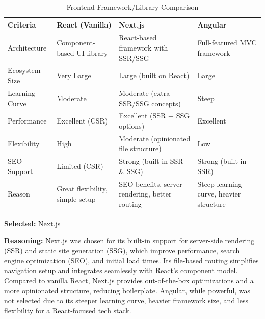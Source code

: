 \begin{table}[H]
\centering
\caption{Frontend Framework/Library Comparison}
\begin{tabular}{|l|p{4cm}|p{4cm}|p{4cm}|}
\hline
\textbf{Criteria}       & \textbf{React (Vanilla)}      & \textbf{Next.js}               & \textbf{Angular}               \\
\hline
Architecture            & Component-based UI library   & React-based framework with SSR/SSG & Full-featured MVC framework    \\
Ecosystem Size          & Very Large                   & Large (built on React)         & Large                          \\
Learning Curve          & Moderate                     & Moderate (extra SSR/SSG concepts) & Steep                          \\
Performance             & Excellent (CSR)              & Excellent (SSR + SSG options)  & Excellent                      \\
Flexibility             & High                         & Moderate (opinionated file structure) & Low                           \\
SEO Support             & Limited (CSR)                & Strong (built-in SSR \& SSG)   & Strong (built-in SSR)          \\
Reason                  & Great flexibility, simple setup & SEO benefits, server rendering, better routing & Steep learning curve, heavier structure \\
\hline
\end{tabular}
\label{tab:frontend-framework-comparison}
\end{table}

\textbf{Selected:} Next.js \par
\textbf{Reasoning:} Next.js was chosen for its built-in support for server-side rendering (SSR) and static site generation (SSG), which improve performance, search engine optimization (SEO), and initial load times. Its file-based routing simplifies navigation setup and integrates seamlessly with React’s component model. Compared to vanilla React, Next.js provides out-of-the-box optimizations and a more opinionated structure, reducing boilerplate. Angular, while powerful, was not selected due to its steeper learning curve, heavier framework size, and less flexibility for a React-focused tech stack.

\vspace{2em}

